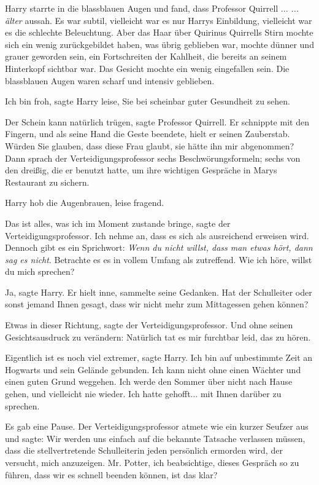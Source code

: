 Harry starrte in die blassblauen Augen und fand, dass Professor Quirrell ...
\emph{... älter} aussah. Es war subtil, vielleicht war es nur Harrys Einbildung,
vielleicht war es die schlechte Beleuchtung. Aber das Haar über Quirinus
Quirrells Stirn mochte sich ein wenig zurückgebildet haben, was übrig geblieben
war, mochte dünner und grauer geworden sein, ein Fortschreiten der Kahlheit, die
bereits an seinem Hinterkopf sichtbar war. Das Gesicht mochte ein wenig
eingefallen sein. Die blassblauen Augen waren scharf und intensiv geblieben.

\glqq{}Ich bin froh\grqq{}, sagte Harry leise, \glqq{}Sie bei scheinbar guter
Gesundheit zu sehen.\grqq{}

\glqq{}Der Schein kann natürlich trügen\grqq{}, sagte Professor Quirrell. Er
schnippte mit den Fingern, und als seine Hand die Geste beendete, hielt er
seinen Zauberstab. \glqq{}Würden Sie glauben, dass diese Frau glaubt, sie hätte
ihn mir abgenommen?\grqq{} Dann sprach der Verteidigungsprofessor sechs
Beschwörungsformeln; sechs von den dreißig, die er benutzt hatte, um ihre
wichtigen Gespräche in Marys Restaurant zu sichern.

Harry hob die Augenbrauen, leise fragend.

\glqq{}Das ist alles, was ich im Moment zustande bringe\grqq{}, sagte der
Verteidigungsprofessor. \glqq{}Ich nehme an, dass es sich als ausreichend
erweisen wird. Dennoch gibt es ein Sprichwort: \emph{Wenn du nicht willst, dass
man etwas hört, dann sag es nicht}. Betrachte es es in vollem Umfang als
zutreffend. Wie ich höre, willst du mich sprechen?\grqq{}

\glqq{}Ja\grqq{}, sagte Harry. Er hielt inne, sammelte seine Gedanken. \glqq{}Hat
der Schulleiter oder sonst jemand Ihnen gesagt, dass wir nicht mehr zum
Mittagessen gehen können?\grqq{}

\glqq{}Etwas in dieser Richtung\grqq{}, sagte der Verteidigungsprofessor. Und
ohne seinen Gesichtsausdruck zu verändern: \glqq{}Natürlich tat es mir furchtbar
leid, das zu hören.\grqq{}

\glqq{}Eigentlich ist es noch viel extremer\grqq{}, sagte Harry. \glqq{}Ich bin
auf unbestimmte Zeit an Hogwarts und sein Gelände gebunden. Ich kann nicht ohne
einen Wächter und einen guten Grund weggehen. Ich werde den Sommer über nicht
nach Hause gehen, und vielleicht nie wieder. Ich hatte gehofft... mit Ihnen
darüber zu sprechen.\grqq{}

Es gab eine Pause. Der Verteidigungsprofessor atmete wie ein kurzer Seufzer aus
und sagte: \glqq{}Wir werden uns einfach auf die bekannte Tatsache verlassen
müssen, dass die stellvertretende Schulleiterin jeden persönlich ermorden wird,
der versucht, mich anzuzeigen. Mr. Potter, ich beabsichtige, dieses Gespräch so
zu führen, dass wir es schnell beenden können, ist das klar?\grqq{}

